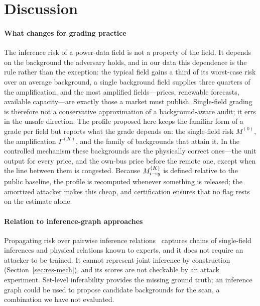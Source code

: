 \section{Discussion}\label{sec:discussion}

\paragraph{What changes for grading practice}
The inference risk of a power-data field is not a property of the field. It depends on the background
the adversary holds, and in our data this dependence is the rule rather than the exception: the
typical field gains a third of its worst-case risk over an average background, a single background
field supplies three quarters of the amplification, and the most amplified fields---prices, renewable
forecasts, available capacity---are exactly those a market must publish. Single-field grading is
therefore not a conservative approximation of a background-aware audit; it errs in the unsafe
direction. The profile proposed here keeps the familiar form of a grade per field but reports what the
grade depends on: the single-field risk $M^{(0)}$, the amplification $\Gamma^{(K)}$, and the family of
backgrounds that attain it. In the controlled mechanism these backgrounds are the physically correct
ones---the unit output for every price, and the own-bus price before the remote one, except when the
line between them is congested. Because $M^{(K)}_{i \to y}$ is defined relative to the public baseline, the profile
is recomputed whenever something is released; the amortized attacker makes this cheap, and
certification ensures that no flag rests on the estimate alone.

\paragraph{Relation to inference-graph approaches}
Propagating risk over pairwise inference relations~\cite{hu2026ignn} captures chains of
single-field inferences and physical relations known to experts, and it does not require an
attacker to be trained. It cannot represent joint inference by construction (Section~\ref{sec:res-mech}),
and its scores are not checkable by an attack experiment. Set-level inferability provides the
missing ground truth; an inference graph could be used to propose candidate backgrounds for the
scan, a combination we have not evaluated.

